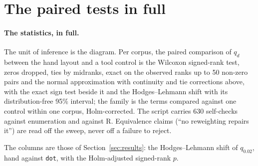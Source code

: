 \documentclass[a4paper,UKenglish]{gd-lipics-v3}
\begin{document}
\section{The paired tests in full}\label{app:pairs}

\paragraph{The statistics, in full.} The unit of inference is the diagram. Per corpus, the paired
comparison of $q_d$ between the hand layout and a tool control is the Wilcoxon signed-rank
test, zeros dropped, ties by midranks, exact on the observed ranks up to 50 non-zero pairs
and the normal approximation with continuity and tie corrections above, with the exact sign
test beside it and the Hodges--Lehmann shift with its distribution-free 95\% interval; the
family is the terms compared against one control within one corpus, Holm-corrected. The
script carries 630 self-checks against enumeration and against R. Equivalence claims (``no
reweighting repairs it'') are read off the sweep, never off a failure to reject.

The columns are those of Section~\ref{sec:results}: the Hodges--Lehmann shift of
$q_{0.02}$, hand against \texttt{dot}, with the Holm-adjusted signed-rank $p$.
\end{document}

